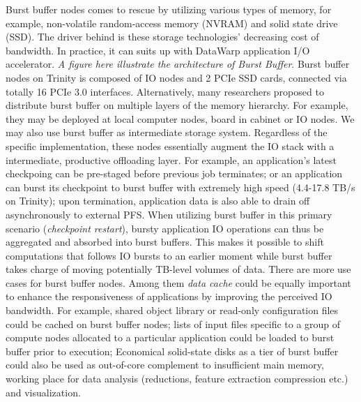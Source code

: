 Burst buffer nodes comes to rescue by utilizing
various types of memory, for example, non-volatile random-access memory (NVRAM) and
solid state drive (SSD).
The driver behind is these storage technologies' decreasing cost of bandwidth.
In practice, it can suits up with DataWarp application I/O accelerator\cite{DataWarp}.
\textit{A figure here illustrate the architecture of Burst Buffer}.
Burst buffer nodes on Trinity is composed of IO nodes and 2 PCIe SSD cards,
connected via totally 16 PCIe 3.0 interfaces.
Alternatively, many researchers proposed to distribute burst buffer 
on multiple layers of the memory hierarchy\cite{Romanus:CORR:15}.
For example, they may be deployed at local computer nodes, board in cabinet or IO nodes.
We may also use burst buffer as intermediate storage system.
Regardless of the specific implementation, these nodes essentially augment
the IO stack with a intermediate, productive offloading layer.
For example, an application's latest checkpoing can be pre-staged
before previous job terminates;
or an application can burst its checkpoint to burst buffer
with extremely high speed (4.4-17.8 TB/s on Trinity);
upon termination, application data is also able to drain off
asynchronously to external PFS.
When utilizing burst buffer in this primary scenario (\textit{checkpoint restart}),
bursty application IO operations can thus be aggregated and absorbed into burst buffers.
This makes it possible to shift computations that follows IO bursts to an earlier moment
while burst buffer takes charge of moving potentially TB-level volumes of data.
There are more use cases for burst buffer nodes.
Among them \textit{data cache} could be equally important to enhance the responsiveness
of applications by improving the perceived IO bandwidth\cite{BBUseCase}.
For example, shared object library or read-only configuration files could be
cached on burst buffer nodes;
lists of input files specific to a group of compute nodes allocated to
a particular application could be loaded to burst buffer prior to execution;
Economical solid-state disks as a tier of burst buffer could also be used as
out-of-core complement to insufficient main memory\cite{Romanus:CORR:15},
working place for data analysis (reductions, feature extraction compression etc.)
and visualization\cite{BBUseCase}.

